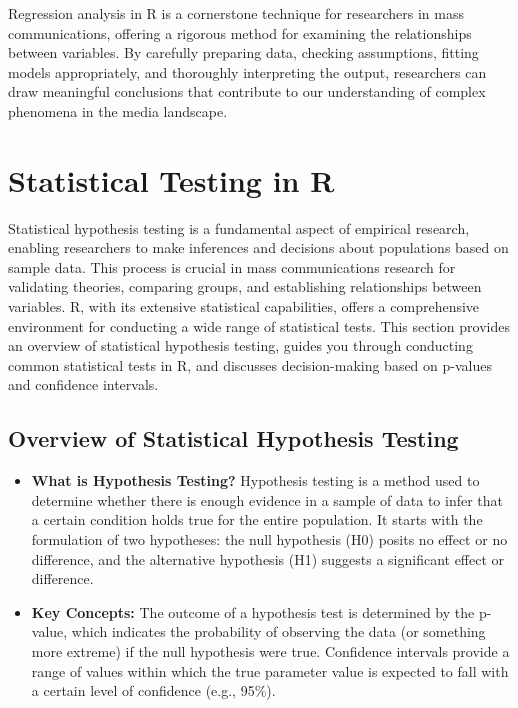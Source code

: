 \documentclass[
]{book}
\begin{document}
Regression analysis in R is a cornerstone technique for researchers in mass communications, offering a rigorous method for examining the relationships between variables. By carefully preparing data, checking assumptions, fitting models appropriately, and thoroughly interpreting the output, researchers can draw meaningful conclusions that contribute to our understanding of complex phenomena in the media landscape.

\hypertarget{statistical-testing-in-r}{%
\section{Statistical Testing in R}\label{statistical-testing-in-r}}

Statistical hypothesis testing is a fundamental aspect of empirical research, enabling researchers to make inferences and decisions about populations based on sample data. This process is crucial in mass communications research for validating theories, comparing groups, and establishing relationships between variables. R, with its extensive statistical capabilities, offers a comprehensive environment for conducting a wide range of statistical tests. This section provides an overview of statistical hypothesis testing, guides you through conducting common statistical tests in R, and discusses decision-making based on p-values and confidence intervals.

\hypertarget{overview-of-statistical-hypothesis-testing}{%
\subsection*{Overview of Statistical Hypothesis Testing}\label{overview-of-statistical-hypothesis-testing}}

\begin{itemize}
\item
  \textbf{What is Hypothesis Testing?} Hypothesis testing is a method used to determine whether there is enough evidence in a sample of data to infer that a certain condition holds true for the entire population. It starts with the formulation of two hypotheses: the null hypothesis (H0) posits no effect or no difference, and the alternative hypothesis (H1) suggests a significant effect or difference.
\item
  \textbf{Key Concepts:} The outcome of a hypothesis test is determined by the p-value, which indicates the probability of observing the data (or something more extreme) if the null hypothesis were true. Confidence intervals provide a range of values within which the true parameter value is expected to fall with a certain level of confidence (e.g., 95\%).
\end{itemize}
\end{document}
